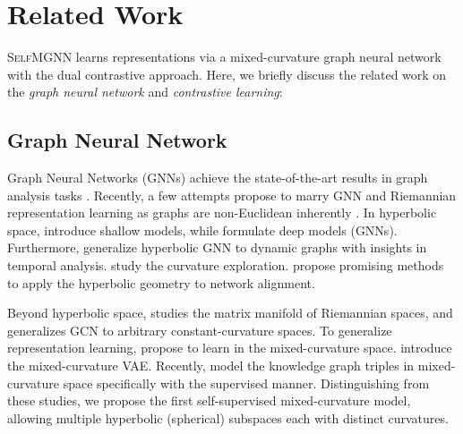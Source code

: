 

\section{Related Work}

\textsc{SelfMGNN} learns representations via a mixed-curvature graph neural network with the dual contrastive approach. 
Here, we briefly discuss the related work on the \emph{graph neural network} and \emph{contrastive learning}:

\subsection{Graph Neural Network}
Graph Neural Networks (GNNs) achieve the state-of-the-art results in graph analysis tasks \cite{DouL0DPY20,pengh2021tois}.
Recently, a few attempts propose to marry GNN and Riemannian representation learning
\cite{HAN,mathieu2019continuous,monath2019gradient}
as graphs are non-Euclidean inherently \cite{krioukov2010hyperbolic}.
In hyperbolic space, \citet{nickel2017poincare,suzuki2019hyperbolic} introduce shallow models,
while \citet{HGNN,HGCN,ZhangWSLS21} formulate deep models (GNNs).
Furthermore, \citet{Sun21hvgnn} generalize hyperbolic GNN to dynamic graphs with insights in temporal analysis. 
\citet{fuxc2020icdm} study the curvature exploration.
\citet{Sun20jointAlign,Wang0Z20} propose promising methods to apply the hyperbolic geometry to network alignment.

Beyond hyperbolic space,
\citet{CruceruBG21} studies the matrix manifold of Riemannian spaces,
and
\citet{BachmannBG20} generalizes GCN to arbitrary constant-curvature spaces.
To generalize representation learning, \citet{GuSGR19}  propose to learn in the mixed-curvature space.
\citet{SkopekGB20} introduce the mixed-curvature VAE.
Recently, \citet{WangWSWNAXYC21} model the knowledge graph triples in mixed-curvature space specifically with the supervised manner. 
Distinguishing from these studies, we propose the first self-supervised mixed-curvature model, allowing multiple hyperbolic (spherical) subspaces each with distinct curvatures.  


